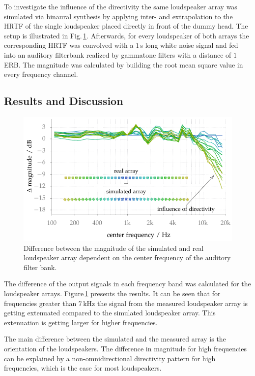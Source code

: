 To investigate the influence of the directivity the same loudspeaker array was
simulated via binaural synthesis by applying inter- and extrapolation to the \ac{HRTF} of the
single loudspeaker placed directly in front of the dummy head. The setup is
illustrated in Fig.\,\ref{fig:array_directivity}. Afterwards, for every
loudspeaker of both arrays the corresponding \ac{HRTF} was convolved with a $1$\,s
long white noise signal and fed into an auditory filterbank realized by
gammatone filters with a distance of $1$\,ERB. The magnitude was calculated by
building the root mean square value in every frequency channel.

\subsection{Results and Discussion}
%
\begin{figure}
    \centering
    \includegraphics{fig4_06/fig4_06}
    \caption{Difference between the magnitude of the simulated and real
    loudspeaker array dependent on the center frequency of the auditory
    filter bank.
    }
    \label{fig:array_directivity}
\end{figure}
%
The difference of the output signals in each frequency band was calculated for
the loudspeaker arrays. Figure\,\ref{fig:array_directivity} presents the
results. It can be seen that for frequencies greater than $7$\,kHz the signal
from the measured loudspeaker array is getting extenuated compared to the
simulated loudspeaker array. This extenuation is getting larger for higher
frequencies.

The main difference between the
simulated and the measured array is the orientation of the loudspeakers.
The difference in magnitude for high frequencies can be explained by a
non-omnidirectional directivity pattern for high frequencies, which is the case
for most loudspeakers. 


